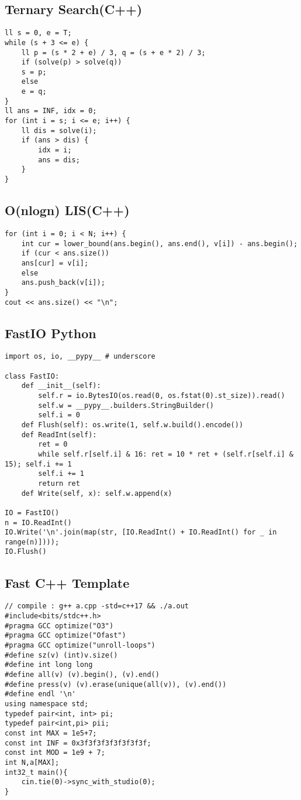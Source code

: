 \documentclass[landscape, 8pt, a4paper, oneside, twocolumn]{extarticle}
\begin{document}
\subsection{Ternary Search(C++)}
\begin{verbatim}
ll s = 0, e = T;
while (s + 3 <= e) {
	ll p = (s * 2 + e) / 3, q = (s + e * 2) / 3;
	if (solve(p) > solve(q))
	s = p;
	else
	e = q;
}
ll ans = INF, idx = 0;
for (int i = s; i <= e; i++) {
	ll dis = solve(i);
	if (ans > dis) {
		idx = i;
		ans = dis;
	}
}
\end{verbatim}
\subsection{O(nlogn) LIS(C++)}
\begin{verbatim}
for (int i = 0; i < N; i++) {
	int cur = lower_bound(ans.begin(), ans.end(), v[i]) - ans.begin();
	if (cur < ans.size())
	ans[cur] = v[i];
	else
	ans.push_back(v[i]);
}
cout << ans.size() << "\n";
\end{verbatim}
\subsection{FastIO Python}
\begin{verbatim}
import os, io, __pypy__ # underscore

class FastIO:
	def __init__(self):
		self.r = io.BytesIO(os.read(0, os.fstat(0).st_size)).read()
		self.w = __pypy__.builders.StringBuilder()
		self.i = 0
	def Flush(self): os.write(1, self.w.build().encode())
	def ReadInt(self):
		ret = 0
		while self.r[self.i] & 16: ret = 10 * ret + (self.r[self.i] & 15); self.i += 1
		self.i += 1
		return ret
	def Write(self, x): self.w.append(x)

IO = FastIO()
n = IO.ReadInt()
IO.Write('\n'.join(map(str, [IO.ReadInt() + IO.ReadInt() for _ in range(n)])));
IO.Flush()
\end{verbatim}
\subsection{Fast C++ Template}
\begin{verbatim}
// compile : g++ a.cpp -std=c++17 && ./a.out
#include<bits/stdc++.h>
#pragma GCC optimize("O3")
#pragma GCC optimize("Ofast")
#pragma GCC optimize("unroll-loops")
#define sz(v) (int)v.size()
#define int long long
#define all(v) (v).begin(), (v).end()
#define press(v) (v).erase(unique(all(v)), (v).end())
#define endl '\n'
using namespace std;
typedef pair<int, int> pi;
typedef pair<int,pi> pii;
const int MAX = 1e5+7;
const int INF = 0x3f3f3f3f3f3f3f3f;
const int MOD = 1e9 + 7;
int N,a[MAX];
int32_t main(){
	cin.tie(0)->sync_with_studio(0);
}
\end{verbatim}
\end{document}
